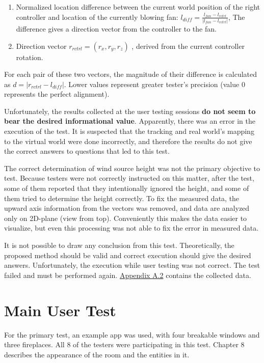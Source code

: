\begin{enumerate}
\item{Normalized location difference between the current world position of the right
controller and location of the currently blowing fan:
\( l_{diff} = \frac{l_{fan} - l_{rctrl}}{|l_{fan} - l_{rctrl}|} \),
 The difference gives a direction vector from the controller to the fan.}
\item{Direction vector \( r_{rctrl} = (r_x, r_y, r_z) \) , derived from the current controller rotation.}
\end{enumerate}

For each pair of these two vectors, the magnitude of their difference is calculated
as \( d = | r_{rctrl} - l_{diff} | \).
Lower values represent greater tester’s precision (value \( 0 \) represents the 
perfect alignment).


Unfortunately, the results collected at the user testing sessions
\textbf{do not seem to bear the desired informational value}.
Apparently, there was an error in the execution of the test. It is suspected that
the tracking and real world’s mapping to the virtual world were done
incorrectly, and therefore the results do not give the correct answers to
questions that led to this test.

The correct determination of wind source height was not the primary
objective to test. Because testers were not correctly instructed on this matter,
after the test, some of them reported that they intentionally ignored the
height, and some of them tried to determine the height correctly.
To fix the measured data, the upward axis information from the vectors was
removed, and data are analyzed only on 2D-plane (view from top).
Conveniently this makes the data easier to visualize, but even this
processing was not able to fix the error in measured data.

It is not possible to draw any conclusion from this test. Theoretically, the
proposed method should be valid and correct execution should give the
desired answers. Unfortunately, the execution while user testing was not
correct. The test failed and must be performed again. 
\hyperref[appx:a]{Appendix A.2} contains the collected data.


\hypertarget{x-main-user-test}{\section{Main User Test}}
For the primary test, an example app was used, with four breakable windows
and three fireplaces. All 8 of the testers were participating
in this test. Chapter 8 describes the appearance of the room and the entities in it.

